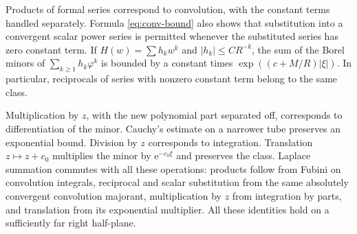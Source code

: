\documentclass[11pt,a4paper]{article}
\numberwithin{equation}{section}
\theoremstyle{definition}
\theoremstyle{remark}
\newcommand{\ee}{\mathrm e}
\begin{document}
Products of formal series correspond to convolution, with the constant
terms handled separately.  Formula \eqref{eq:conv-bound} also shows that
substitution into a convergent scalar power series is permitted whenever
the substituted series has zero constant term.  If $H(w)=\sum h_kw^k$
and $|h_k|\le CR^{-k}$, the sum of the Borel minors of
$\sum_{k\ge1}h_k\varphi^k$ is bounded by a constant times
$\exp((c+M/R)|\xi|)$.  In particular, reciprocals of series with nonzero
constant term belong to the same class.

Multiplication by $z$, with the new polynomial part separated off,
corresponds to differentiation of the minor.  Cauchy's estimate on a
narrower tube preserves an exponential bound.  Division by $z$
corresponds to integration.  Translation $z\mapsto z+c_0$ multiplies
the minor by $\ee^{-c_0\xi}$ and preserves the class.  Laplace summation
commutes with all these operations: products follow from Fubini on
convolution integrals, reciprocal and scalar substitution from the same
absolutely convergent convolution majorant, multiplication by $z$ from
integration by parts, and translation from its exponential multiplier.
All these identities hold on a sufficiently far right half-plane.
\end{document}
